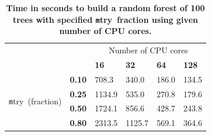 \documentclass[10pt,letterpaper]{article}
\newcommand{\mtry}{{\texttt mtry}}
\begin{document}
\begin{table}[!ht]
\centering
\caption{
{\bf Time in seconds to build a random forest of 100
  trees with specified \mtry\ fraction using given number of CPU cores.}}
\begin{tabular}{|l|l|l|l|l|l|}
\hline
\multicolumn{2}{|l|}{\multirow{2}{*}{}}             & \multicolumn{4}{c|}{Number of CPU cores} \\
\cline{3-6}
\multicolumn{2}{|l|}{}                              & \bf{16} & \bf{32} & \bf{64} & \bf{128} \\
\hline
\multirow{4}{*}{\mtry\ (fraction)}        & \bf{0.10} & 708.3   & 340.0   & 186.0   & 134.5 \\
                                        & \bf{0.25} & 1134.9  & 535.0   & 270.8   & 179.6 \\
                                        & \bf{0.50} & 1724.1  & 856.6   & 428.7   & 243.8 \\
                                        & \bf{0.80} & 2313.5  & 1125.7  & 569.1   & 364.6 \\
\hline
\end{tabular}
\begin{flushleft} 
\end{flushleft}
\label{table10}
\end{table}
\end{document}
